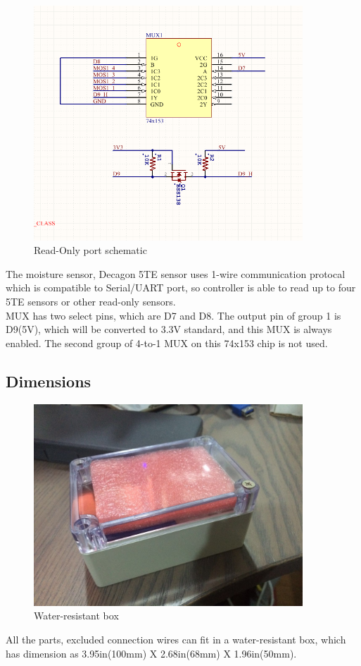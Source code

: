     \begin{figure}[H]
    \centering
    \includegraphics[width=0.9\textwidth]{mosSch.png}
    \caption{\label{fig:moisture sensor schematic}Read-Only port schematic}
    \end{figure}
    The moisture sensor, Decagon 5TE sensor uses 1-wire communication protocal which is compatible to Serial/UART port, so controller is able to read up to four 5TE sensors or other read-only sensors. \\
    MUX has two select pins, which are D7 and D8. The output pin of group 1 is D9(5V), which will be converted to 3.3V standard, and this MUX is always enabled. The second group of 4-to-1 MUX on this 74x153 chip is not used.




  \subsection{Dimensions}
    \begin{figure}[H]
    \centering
    \includegraphics[width=0.9\textwidth]{box.jpg}
    \caption{\label{fig:water-resistant box}Water-resistant box}
    \end{figure}
    All the parts, excluded connection wires can fit in a water-resistant box, which has dimension as 3.95in(100mm) X 2.68in(68mm) X 1.96in(50mm).


